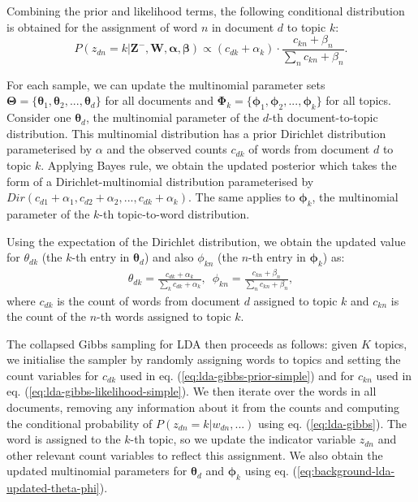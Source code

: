 Combining the prior and likelihood terms, the following conditional distribution is obtained for the assignment of word $n$ in document $d$ to topic $k$:
\begin{equation}
P({z}_{dn}=k \vert \boldsymbol{Z}^{-}, \boldsymbol{W}, \boldsymbol{\alpha}, \boldsymbol{\beta}) \propto (c_{dk} + {\alpha}_k) \cdot \frac{ c_{kn} + {\beta}_n}{\sum_{n} c_{kn} + {\beta}_n}.
\label{eq:lda-gibbs-combined}
\end{equation}

For each sample, we can update the multinomial parameter sets $\boldsymbol{\Theta}=\{\boldsymbol{\theta}_{1}, \boldsymbol{\theta}_{2}, ..., \boldsymbol{\theta}_{d}\}$ for all documents and $\boldsymbol{\Phi}_k=\{\boldsymbol{\phi}_1, \boldsymbol{\phi}_2, ..., \boldsymbol{\phi}_k\}$ for all topics. Consider one $\boldsymbol{\theta}_{d}$, the multinomial parameter of the $d$-th document-to-topic distribution. This multinomial distribution has a prior Dirichlet distribution parameterised by $\alpha$ and the observed counts $c_{dk}$ of words from document $d$ to topic $k$. Applying Bayes rule, we obtain the updated posterior which takes the form of a Dirichlet-multinomial distribution parameterised by $Dir(c_{d1}+{\alpha}_1, c_{d2}+{\alpha}_2, ...,c_{dk}+{\alpha}_k)$. The same applies to $\boldsymbol{\phi}_{k}$, the multinomial parameter of the $k$-th topic-to-word distribution.

Using the expectation of the Dirichlet distribution, we obtain the updated value for $\theta_{dk}$ (the $k$-th entry in ${\boldsymbol{\theta}_{d}}$) and also ${\phi}_{kn}$ (the $n$-th entry in $\boldsymbol{\phi}_{k}$) as:
\begin{align}
{\theta}_{dk} = \frac{c_{dk}+{\alpha}_k}{\sum_{k} c_{dk}+{\alpha}_k}, \enspace {\phi}_{kn} = \frac{c_{kn}+{\beta}_n}{\sum_{n} c_{kn}+{\beta}_n},
\label{eq:background-lda-updated-theta-phi}
\end{align}
where $c_{dk}$ is the count of words from document $d$ assigned to topic $k$ and $c_{kn}$ is the count of the $n$-th words assigned to topic $k$. 

The collapsed Gibbs sampling for LDA then proceeds as follows: given $K$ topics, we initialise the sampler by randomly assigning words to topics and setting the count variables for $c_{dk}$ used in eq. (\ref{eq:lda-gibbs-prior-simple}) and for $c_{kn}$ used in eq. (\ref{eq:lda-gibbs-likelihood-simple}). We then iterate over the words in all documents, removing any information about it from the counts and computing the conditional probability of $P({z}_{dn}=k \vert {w}_{dn}, ...)$ using eq. (\ref{eq:lda-gibbs}). The word is assigned to the $k$-th topic, so we update the indicator variable ${z}_{dn}$ and other relevant count variables to reflect this assignment. We also obtain the updated multinomial parameters for $\boldsymbol{\theta}_d$ and $\boldsymbol{\phi}_k$ using eq. (\ref{eq:background-lda-updated-theta-phi}).

